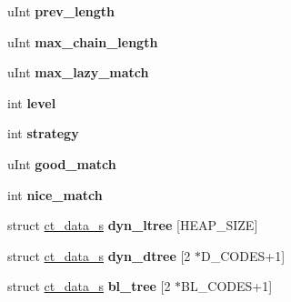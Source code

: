 \begin{DoxyCompactItemize}
\item 
\hypertarget{structinternal__state_a7619fb70f9f66ff21b419b8ceac4904c}{u\+Int {\bfseries prev\+\_\+length}}\label{structinternal__state_a7619fb70f9f66ff21b419b8ceac4904c}

\item 
\hypertarget{structinternal__state_ab1ffa7feb159edec170574813fae3279}{u\+Int {\bfseries max\+\_\+chain\+\_\+length}}\label{structinternal__state_ab1ffa7feb159edec170574813fae3279}

\item 
\hypertarget{structinternal__state_ab74215ec1c106bf588a7642927d47b84}{u\+Int {\bfseries max\+\_\+lazy\+\_\+match}}\label{structinternal__state_ab74215ec1c106bf588a7642927d47b84}

\item 
\hypertarget{structinternal__state_a7ad2ab1df80c8cab4ffb97ff84e88c62}{int {\bfseries level}}\label{structinternal__state_a7ad2ab1df80c8cab4ffb97ff84e88c62}

\item 
\hypertarget{structinternal__state_a67219312df7fd2f86e06e6f14700eb28}{int {\bfseries strategy}}\label{structinternal__state_a67219312df7fd2f86e06e6f14700eb28}

\item 
\hypertarget{structinternal__state_a68ba00254242017f330dca5e0191bca4}{u\+Int {\bfseries good\+\_\+match}}\label{structinternal__state_a68ba00254242017f330dca5e0191bca4}

\item 
\hypertarget{structinternal__state_a39ab99e52138c0628f645bc1e0c69a04}{int {\bfseries nice\+\_\+match}}\label{structinternal__state_a39ab99e52138c0628f645bc1e0c69a04}

\item 
\hypertarget{structinternal__state_ae491d8ff42bdc841c8101f028bd8cdc6}{struct \hyperlink{structct__data__s}{ct\+\_\+data\+\_\+s} {\bfseries dyn\+\_\+ltree} \mbox{[}H\+E\+A\+P\+\_\+\+S\+I\+Z\+E\mbox{]}}\label{structinternal__state_ae491d8ff42bdc841c8101f028bd8cdc6}

\item 
\hypertarget{structinternal__state_a6a5482b11495855c29591339805d8aa8}{struct \hyperlink{structct__data__s}{ct\+\_\+data\+\_\+s} {\bfseries dyn\+\_\+dtree} \mbox{[}2 $\ast$D\+\_\+\+C\+O\+D\+E\+S+1\mbox{]}}\label{structinternal__state_a6a5482b11495855c29591339805d8aa8}

\item 
\hypertarget{structinternal__state_a6e5316dd8da94406e538f5eab908947d}{struct \hyperlink{structct__data__s}{ct\+\_\+data\+\_\+s} {\bfseries bl\+\_\+tree} \mbox{[}2 $\ast$B\+L\+\_\+\+C\+O\+D\+E\+S+1\mbox{]}}\label{structinternal__state_a6e5316dd8da94406e538f5eab908947d}


\end{DoxyCompactItemize}

